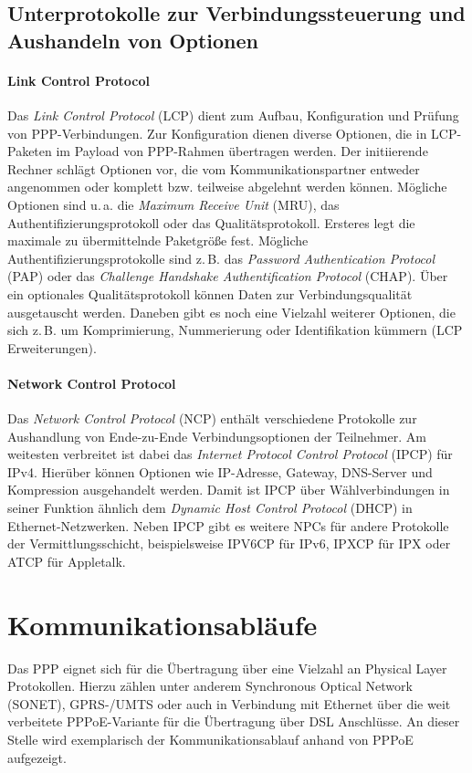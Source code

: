\documentclass[journal,11pt]{IEEEtran}
\begin{document}
\subsection{Unterprotokolle zur Verbindungssteuerung und Aushandeln von Optionen}
\paragraph{Link Control Protocol}
Das \textit{Link Control Protocol} (LCP) dient zum Aufbau, Konfiguration und Prüfung von PPP-Verbindungen. Zur Konfiguration dienen diverse Optionen, die in LCP-Paketen im Payload von PPP-Rahmen übertragen werden. Der initiierende Rechner schlägt Optionen vor, die vom Kommunikationspartner entweder angenommen oder komplett bzw. teilweise abgelehnt werden können. Mögliche Optionen sind u.\,a. die \textit{Maximum Receive Unit} (MRU), das Authentifizierungsprotokoll oder das Qualitätsprotokoll. Ersteres legt die maximale zu übermittelnde Paketgröße fest. Mögliche Authentifizierungsprotokolle sind z.\,B. das \textit{Password Authentication Protocol} (PAP) oder das \textit{Challenge Handshake Authentification Protocol} (CHAP). Über ein optionales Qualitätsprotokoll können Daten zur Verbindungsqualität ausgetauscht werden. Daneben gibt es noch eine Vielzahl weiterer Optionen, die sich z.\,B. um Komprimierung, Nummerierung oder Identifikation kümmern (LCP Erweiterungen).
\paragraph{Network Control Protocol}
Das \textit{Network Control Protocol} (NCP) enthält verschiedene Protokolle zur Aushandlung von Ende-zu-Ende Verbindungsoptionen der Teilnehmer. Am weitesten verbreitet ist dabei das \textit{Internet Protocol Control Protocol} (IPCP) für IPv4. Hierüber können Optionen wie IP-Adresse, Gateway, DNS-Server und Kompression ausgehandelt werden. Damit ist IPCP über Wählverbindungen in seiner Funktion ähnlich dem \textit{Dynamic Host Control Protocol} (DHCP) in Ethernet-Netzwerken.
Neben IPCP gibt es weitere NPCs für andere Protokolle der Vermittlungsschicht, beispielsweise IPV6CP für IPv6, IPXCP für IPX oder ATCP für Appletalk.


\section{Kommunikationsabläufe}
Das PPP eignet sich für die Übertragung über eine Vielzahl an Physical Layer Protokollen.
Hierzu zählen unter anderem  Synchronous Optical Network (SONET), GPRS-/UMTS oder auch
in Verbindung mit Ethernet über die weit verbeitete PPPoE-Variante für die Übertragung
über DSL Anschlüsse\cite{IEEEhowto:kopka}.
An dieser Stelle wird exemplarisch der Kommunikationsablauf anhand von PPPoE aufgezeigt.
\end{document}
